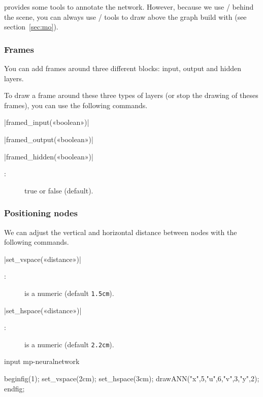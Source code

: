 \documentclass[english]{ltxdoc}
\begin{document}
\mpneural provides some tools to annotate the network. However, because we use
\MO/ behind the scene, you can always use \MO/ tools to draw above the graph
build with \mpneural (see section~\ref{sec:mo}).

\subsubsection{Frames}

You can add frames around three different blocks: input, output and hidden
layers. 

To draw a frame around these three types of layers (or stop the drawing of theses frames), you
can use the following commands.


\commande|framed_input(«boolean»)|\smallskip{}


\commande|framed_output(«boolean»)|\smallskip{}


\commande|framed_hidden(«boolean»)|\smallskip{}
\begin{description}
  \item[:] true or false (default).
\end{description}

\subsubsection{Positioning nodes}

We can adjust the vertical and horizontal distance between nodes with the
following commands. 

\commande|set_vspace(«distance»)|\smallskip{}

\begin{description}
  \item[:] is a numeric (default \lstinline+1.5cm+).
\end{description}


\commande|set_hspace(«distance»)|\smallskip{}

\begin{description}
  \item[:] is a numeric (default \lstinline+2.2cm+).
\end{description}

\begin{ExempleMP}
input mp-neuralnetwork

beginfig(1);
set_vspace(2cm); 
set_hspace(3cm);
drawANN("x",5,"u",6,"v",3,"y",2);
endfig;
\end{ExempleMP}
\end{document}
